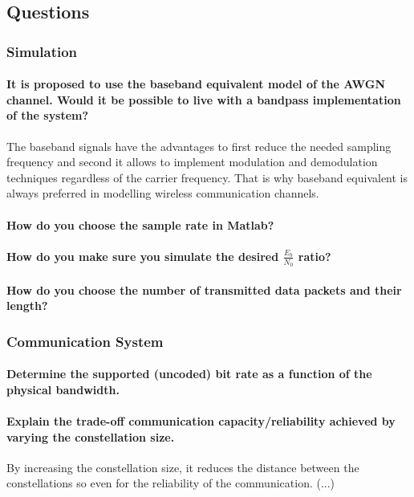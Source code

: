 \subsection{Questions}
\subsubsection{Simulation}
\paragraph{It is proposed to use the baseband equivalent model of the AWGN channel. Would it be
possible to live with a bandpass implementation of the system?}
The baseband signals have the advantages to first reduce the needed sampling frequency and second it allows to implement modulation and demodulation techniques regardless of the carrier frequency. That is why baseband equivalent is always preferred in modelling wireless communication channels.
\paragraph{How do you choose the sample rate in Matlab?}
\paragraph{How do you make sure you simulate the desired $\frac{E_b}{N_0}$ ratio?}
\paragraph{How do you choose the number of transmitted data packets and their length?}

\subsubsection{Communication System}
\paragraph{Determine the supported (uncoded) bit rate as a function of the physical bandwidth.}
\paragraph{Explain the trade-off communication capacity/reliability achieved by varying the constellation size.} 
By increasing the constellation size, it reduces the distance between the constellations so even for the reliability of the communication. (...)

